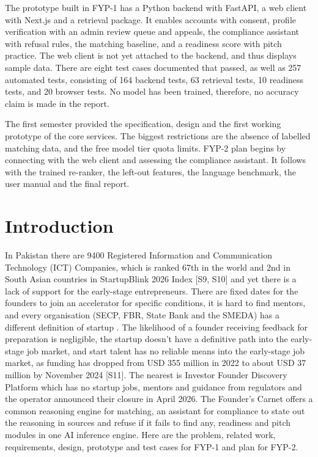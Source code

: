 \documentclass{FastFyp}
\newcommand{\src}[1]{[#1]}
\begin{document}
The prototype built in FYP-1 has a Python backend with FastAPI, a web client with Next.js and a retrieval package. It enables accounts with consent, profile verification with an admin review queue and appeals, the compliance assistant with refusal rules, the matching baseline, and a readiness score with pitch practice. The web client is not yet attached to the backend, and thus displays sample data. There are eight test cases documented that passed, as well as 257 automated tests, consisting of 164 backend tests, 63 retrieval tests, 10 readiness tests, and 20 browser tests. No model has been trained, therefore, no accuracy claim is made in the report.

The first semester provided the specification, design and the first working prototype of the core services. The biggest restrictions are the absence of labelled matching data, and the free model tier quota limits. FYP-2 plan begins by connecting with the web client and assessing the compliance assistant. It follows with the trained re-ranker, the left-out features, the language benchmark, the user manual and the final report.
\pagebreak

\pagestyle{fancy} %
\tableofcontents

\pagebreak
\listoffigures	%
\pagebreak
\listoftables %

\mainmatter

\chapter{Introduction}\label{chap:intro}
In Pakistan there are 9400 Registered Information and Communication Technology (ICT) Companies, which is ranked 67th in the world and 2nd in South Asian countries in StartupBlink 2026 Index \src{S9, S10} and yet there is a lack of support for the early-stage entrepreneurs. There are fixed dates for the founders to join an accelerator for specific conditions, it is hard to find mentors, and every organisation (SECP, FBR, State Bank and the SMEDA) has a different definition of startup \cite{ref:secpposition}. The likelihood of a founder receiving feedback for preparation is negligible, the startup doesn't have a definitive path into the early-stage job market, and start talent has no reliable means into the early-stage job market, as funding has dropped from USD 355 million in 2022 to about USD 37 million by November 2024 \src{S11}. The nearest is Investor Founder Discovery Platform which has no startup jobs, mentors and guidance from regulators and the operator announced their closure in April 2026. The Founder's Carnet offers a common reasoning engine for matching, an assistant for compliance to state out the reasoning in sources and refuse if it fails to find any, readiness and pitch modules in one AI inference engine. Here are the problem, related work, requirements, design, prototype and test cases for FYP-1 and plan for FYP-2.
\end{document}
